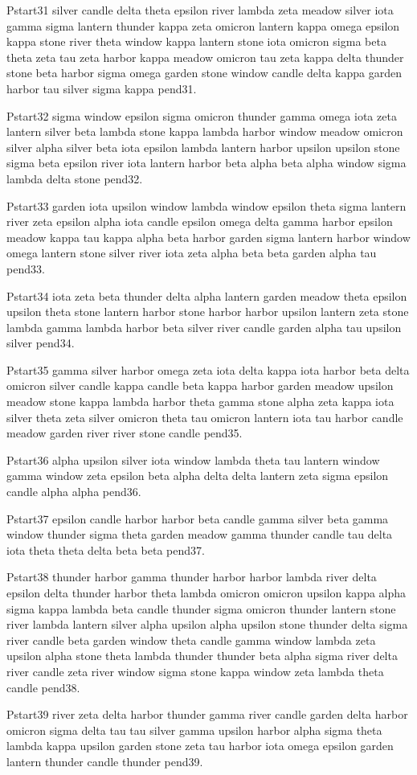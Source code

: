 \documentclass{article}
\begin{document}
Pstart31 silver candle delta theta epsilon river lambda zeta meadow silver iota gamma sigma lantern thunder kappa zeta omicron lantern kappa omega epsilon kappa stone river theta window kappa lantern stone iota omicron sigma beta theta zeta tau zeta harbor kappa meadow omicron tau zeta kappa delta thunder stone beta harbor sigma omega garden stone window candle delta kappa garden harbor tau silver sigma kappa pend31.

Pstart32 sigma window epsilon sigma omicron thunder gamma omega iota zeta lantern silver beta lambda stone kappa lambda harbor window meadow omicron silver alpha silver beta iota epsilon lambda lantern harbor upsilon upsilon stone sigma beta epsilon river iota lantern harbor beta alpha beta alpha window sigma lambda delta stone pend32.

Pstart33 garden iota upsilon window lambda window epsilon theta sigma lantern river zeta epsilon alpha iota candle epsilon omega delta gamma harbor epsilon meadow kappa tau kappa alpha beta harbor garden sigma lantern harbor window omega lantern stone silver river iota zeta alpha beta beta garden alpha tau pend33.

Pstart34 iota zeta beta thunder delta alpha lantern garden meadow theta epsilon upsilon theta stone lantern harbor stone harbor harbor upsilon lantern zeta stone lambda gamma lambda harbor beta silver river candle garden alpha tau upsilon silver pend34.

Pstart35 gamma silver harbor omega zeta iota delta kappa iota harbor beta delta omicron silver candle kappa candle beta kappa harbor garden meadow upsilon meadow stone kappa lambda harbor theta gamma stone alpha zeta kappa iota silver theta zeta silver omicron theta tau omicron lantern iota tau harbor candle meadow garden river river stone candle pend35.

Pstart36 alpha upsilon silver iota window lambda theta tau lantern window gamma window zeta epsilon beta alpha delta delta lantern zeta sigma epsilon candle alpha alpha pend36.

Pstart37 epsilon candle harbor harbor beta candle gamma silver beta gamma window thunder sigma theta garden meadow gamma thunder candle tau delta iota theta theta delta beta beta pend37.

Pstart38 thunder harbor gamma thunder harbor harbor lambda river delta epsilon delta thunder harbor theta lambda omicron omicron upsilon kappa alpha sigma kappa lambda beta candle thunder sigma omicron thunder lantern stone river lambda lantern silver alpha upsilon alpha upsilon stone thunder delta sigma river candle beta garden window theta candle gamma window lambda zeta upsilon alpha stone theta lambda thunder thunder beta alpha sigma river delta river candle zeta river window sigma stone kappa window zeta lambda theta candle pend38.

Pstart39 river zeta delta harbor thunder gamma river candle garden delta harbor omicron sigma delta tau tau silver gamma upsilon harbor alpha sigma theta lambda kappa upsilon garden stone zeta tau harbor iota omega epsilon garden lantern thunder candle thunder pend39.
\end{document}
